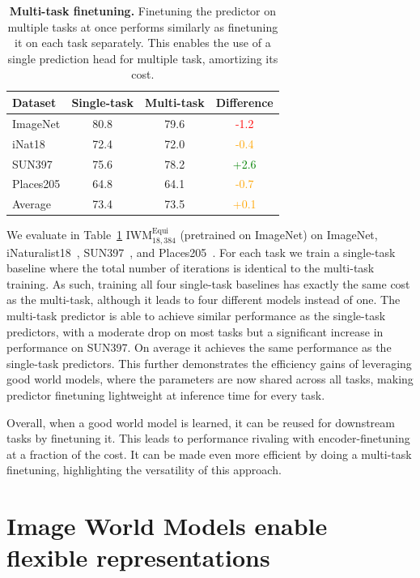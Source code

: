 \documentclass[twocolumn]{fairmeta}
\theoremstyle{plain}
\theoremstyle{definition}
\theoremstyle{remark}
\begin{document}
\begin{table}[!t]
\centering
    \caption{\textbf{Multi-task finetuning.} Finetuning the predictor on multiple tasks at once performs similarly as finetuning it on each task separately. This enables the use of a single prediction head for multiple task, amortizing its cost.}
    \label{tab:multitask}
\begin{tabular}{lccc}
\toprule
Dataset & Single-task & Multi-task & Difference \\
\midrule
ImageNet & 80.8 & 79.6  & \textcolor{Red}{-1.2}  \\
iNat18 & 72.4 & 72.0 & \textcolor{orange}{-0.4} \\
SUN397 & 75.6 & 78.2 & \textcolor{Green}{+2.6}  \\
Places205 & 64.8 & 64.1  & \textcolor{orange}{-0.7}  \\
\midrule
Average & 73.4 & 73.5 & \textcolor{orange}{+0.1} \\
\bottomrule
\end{tabular}
\end{table}

We evaluate in Table~\ref{tab:multitask} $\text{IWM}_{18,384}^\text{Equi}$ (pretrained on ImageNet) on ImageNet, iNaturalist18~\citep{vanhorni2018naturalist}, SUN397~\citep{xiao2010sun}, and Places205~\citep{zhou2014places}. For each task we train a single-task baseline where the total number of iterations is identical to the multi-task training. As such, training all four single-task baselines has exactly the same cost as the multi-task, although it leads to four different models instead of one. The multi-task predictor is able to achieve similar performance as the single-task predictors, with a moderate drop on most tasks but a significant increase in performance on SUN397. On average it achieves the same performance as the single-task predictors. This further demonstrates the efficiency gains of leveraging good world models, where the parameters are now shared across all tasks, making predictor finetuning lightweight at inference time for every task.

Overall, when a good world model is learned, it can be reused for downstream tasks by finetuning it. This leads to performance rivaling with encoder-finetuning at a fraction of the cost. It can be made even more efficient by doing a multi-task finetuning, highlighting the versatility of this approach.

\section{Image World Models enable flexible representations}
\end{document}
